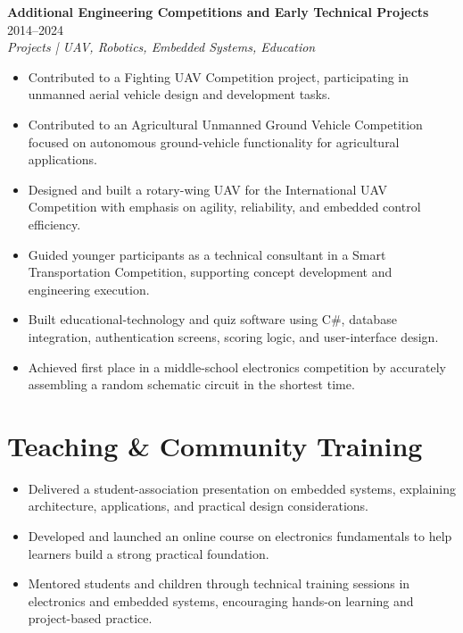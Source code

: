 \documentclass[a4paper,10pt]{article}
\begin{document}
\vspace{3pt}
\textbf{Additional Engineering Competitions and Early Technical Projects} \hfill 2014--2024\\
\textit{Projects | UAV, Robotics, Embedded Systems, Education}
\begin{itemize}
  \item Contributed to a Fighting UAV Competition project, participating in unmanned aerial
        vehicle design and development tasks.
  \item Contributed to an Agricultural Unmanned Ground Vehicle Competition focused on
        autonomous ground-vehicle functionality for agricultural applications.
  \item Designed and built a rotary-wing UAV for the International UAV Competition with
        emphasis on agility, reliability, and embedded control efficiency.
  \item Guided younger participants as a technical consultant in a Smart Transportation
        Competition, supporting concept development and engineering execution.
  \item Built educational-technology and quiz software using C\#, database integration,
        authentication screens, scoring logic, and user-interface design.
  \item Achieved first place in a middle-school electronics competition by accurately
        assembling a random schematic circuit in the shortest time.
\end{itemize}

\section*{Teaching \& Community Training}
\begin{itemize}
  \item Delivered a student-association presentation on embedded systems, explaining
        architecture, applications, and practical design considerations.
  \item Developed and launched an online course on electronics fundamentals to help
        learners build a strong practical foundation.
  \item Mentored students and children through technical training sessions in electronics
        and embedded systems, encouraging hands-on learning and project-based practice.
\end{itemize}

\end{document}
